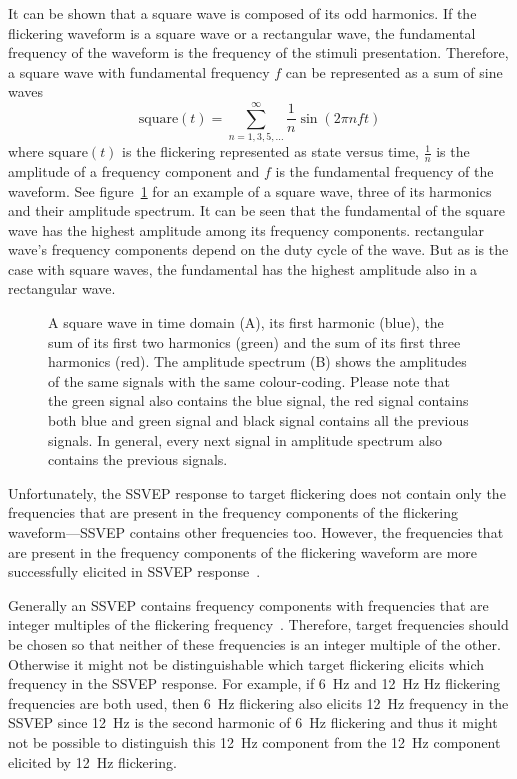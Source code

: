 It can be shown that a \gls{square wave} is composed of its odd \glspl{harmonic}. If the \gls{flickering waveform} is a \gls{square wave} or a \gls{rectangular wave}, the \gls{fundamental} frequency of the waveform is the frequency of the stimuli presentation. Therefore, a \gls{square wave} with \gls{fundamental} frequency $f$ can be represented as a sum of sine waves
\begin{equation}
	\label{eq:square}
	\mbox{square}(t) = \sum_{n=1,3,5,\dots}^{\infty}\frac{1}{n} \sin(2\pi nft)
\end{equation}
where $\mbox{square}(t)$ is the \gls{flickering} represented as \gls{state} versus time, $\frac{1}{n}$ is the amplitude of a \gls{frequency component} and $f$ is the \gls{fundamental} frequency of the waveform. See figure~\ref{fig:square_wave} for an example of a \gls{square wave}, three of its \glspl{harmonic} and their amplitude spectrum. It can be seen that the \gls{fundamental} of the square wave has the highest amplitude among its \glspl{frequency component}. \Gls{rectangular wave}'s \glspl{frequency component} depend on the \gls{duty cycle} of the wave. But as is the case with \glspl{square wave}, the \gls{fundamental} has the highest amplitude also in a \gls{rectangular wave}.

\begin{figure}[h]
	
	\caption{A square wave in time domain (A), its first harmonic (blue), the sum of its first two harmonics (green) and the sum of its first three harmonics (red). The amplitude spectrum (B) shows the amplitudes of the same signals with the same colour-coding. Please note that the green signal also contains the blue signal, the red signal contains both blue and green signal and black signal contains all the previous signals. In general, every next signal in amplitude spectrum also contains the previous signals.}
	\label{fig:square_wave}
\end{figure}

Unfortunately, the \gls{SSVEP} response to \gls{target} \gls{flickering} does not contain only the frequencies that are present in the \glspl{frequency component} of the \gls{flickering waveform}---\gls{SSVEP} contains other frequencies too. However, the frequencies that are present in the \glspl{frequency component} of the \gls{flickering waveform} are more successfully elicited in \gls{SSVEP} response~\cite{square_sine}.

Generally an \gls{SSVEP} contains \glspl{frequency component} with frequencies that are integer multiples of the \gls{flickering} frequency~\cite{ssvep_response}. Therefore, \gls{target} frequencies should be chosen so that neither of these frequencies is an integer multiple of the other. Otherwise it might not be distinguishable which \gls{target} \gls{flickering} elicits which frequency in the \gls{SSVEP} response. For example, if \SI{6}{Hz} and \SI{12}{Hz} Hz \gls{flickering} frequencies are both used, then \SI{6}{Hz} \gls{flickering} also elicits \SI{12}{Hz} frequency in the \gls{SSVEP} since \SI{12}{Hz} is the second harmonic of \SI{6}{Hz} \gls{flickering} and thus it might not be possible to distinguish this \SI{12}{Hz} component from the \SI{12}{Hz} component elicited by \SI{12}{Hz} \gls{flickering}.

